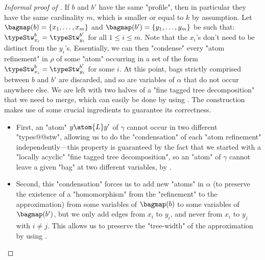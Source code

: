 \begin{proof}[Informal proof of ]
    \AP\label{proof-claim:shortening-paths}
    If $b$ and $b'$ have the same "profile", then in particular they have the same cardinality $m$,
    which is smaller or equal to $k$ by assumption.
    Let $\bagmap(b) = \{x_1,\hdots, x_m\}$ and $\bagmap(b') = \{y_1,\hdots,y_m\}$ be such that: 
    $\typeStw^{b}_{x_i} = \typeStw^{b'}_{y_i}$ for all $1 \leq i \leq m$.
	Note that the $x_i$'s don't need to be distinct from the $y_i$'s.
	Essentially, we can then "condense"
    every "atom refinement" in $\rho$ of some "atom" occurring in a set
    of the form $\typeStw^{b}_{x_i} = \typeStw^{b'}_{y_i}$ for some $i$.
	At this point, bags strictly comprised between
    $b$ and $b'$ are discarded, and so are variables of $\alpha$ that do not occur anywhere else.
    We are left with two halves of a "fine tagged tree decomposition" that we need to merge,
    which can easily be done by using .
    The construction makes use of some crucial ingredients to guarantee its correctness.
    \begin{itemize}
        \item First, an "atom" $y \atom{L} y'$ of $\gamma$ cannot occur
            in two different "types@@stw", allowing us to do the "condensation" of each "atom refinement" independently---this property is guaranteed by the fact that we started
			with a "locally acyclic" "fine tagged tree decomposition", so an "atom" of $\gamma$ cannot leave a given "bag" at two different variables, by
			.
        \item Second, this "condensation" forces us to add new "atoms" in $\alpha$ (to preserve the
            existence of a "homomorphism" from the "refinement" to the approximation)
            from some variables of $\bagmap(b)$ to some variables of $\bagmap(b')$,
            but we only add edges from $x_i$ to $y_i$, and never from $x_i$ to $y_j$ with
			$i \neq j$. This allows us to preserve the "tree-width" of the approximation
			by using .\qedhere
    \end{itemize}
\end{proof}

